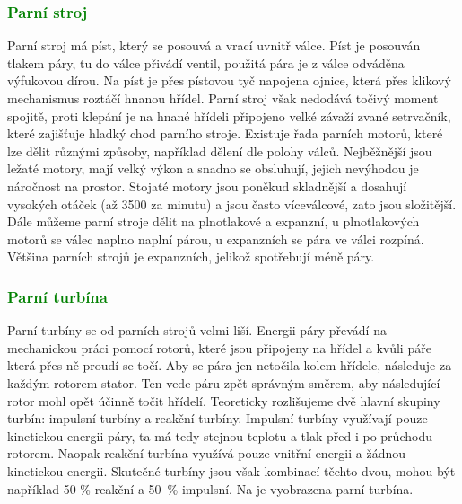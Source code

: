 \subsubsection{\textcolor{green}{Parní stroj}}\label{sc:ParniStroj}
{Parní stroj má píst, který se posouvá a vrací uvnitř válce. Píst je posouván tlakem páry, tu do válce přivádí ventil, použitá pára je z válce odváděna výfukovou dírou. Na píst je přes pístovou tyč napojena ojnice, která přes klikový mechanismus roztáčí hnanou hřídel. Parní stroj však nedodává točivý moment spojitě, proti klepání je na hnané hřídeli připojeno velké závaží zvané setrvačník, které zajišťuje hladký chod parního stroje.}
\cite{st:parniStroj}\cite{vutb:parniStroj}\odst
{Existuje řada parních motorů, které lze dělit různými způsoby, například dělení dle polohy válců. Nejběžnější jsou ležaté motory, mají velký výkon a snadno se obsluhují, jejich nevýhodou je náročnost na prostor. Stojaté motory jsou poněkud skladnější a dosahují vysokých otáček (až 3500 za minutu) a jsou často víceválcové, zato jsou složitější. Dále můžeme parní stroje dělit na plnotlakové a expanzní, u plnotlakových motorů se válec naplno naplní párou, u expanzních se pára ve válci rozpíná. Většina parních strojů je expanzních, jelikož spotřebují méně páry.}
\cite{st:parniStroj}\cite{vutb:parniStroj}

\newpage

\subsubsection{\textcolor{green}{Parní turbína}\label{sc:ParniTurbina}}
{Parní turbíny se od parních strojů velmi liší. Energii páry převádí na mechanickou práci pomocí rotorů, které jsou připojeny na hřídel a kvůli páře která přes ně proudí se točí. Aby se pára jen netočila kolem hřídele, následuje za každým rotorem stator. Ten vede páru zpět správným směrem, aby následující rotor mohl opět účinně točit hřídelí.}
\cite{LESICS:WorkingOfSteamTurbine}\odst
{Teoreticky rozlišujeme dvě hlavní skupiny turbín: impulsní turbíny a reakční turbíny. Impulsní turbíny využívají pouze kinetickou energii páry, ta má tedy stejnou teplotu a tlak před i po průchodu rotorem. Naopak reakční turbína využívá pouze vnitřní energii a žádnou kinetickou energii. Skutečné turbíny jsou však kombinací těchto dvou, mohou být například 50 \% reakční a 50~\% impulsní. Na  je vyobrazena parní turbína.}
\cite{LESICS:WorkingOfSteamTurbine}

